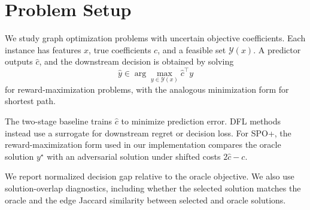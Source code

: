 \section{Problem Setup}

We study graph optimization problems with uncertain objective coefficients. Each
instance has features $x$, true coefficients $c$, and a feasible set
$\mathcal{Y}(x)$. A predictor outputs $\hat{c}$, and the downstream decision is
obtained by solving
\[
    \hat{y} \in \arg\max_{y \in \mathcal{Y}(x)} \hat{c}^{\top}y
\]
for reward-maximization problems, with the analogous minimization form for
shortest path.

The two-stage baseline trains $\hat{c}$ to minimize prediction error. DFL
methods instead use a surrogate for downstream regret or decision loss. For
SPO+, the reward-maximization form used in our implementation compares the
oracle solution $y^\star$ with an adversarial solution under shifted costs
$2\hat{c}-c$.

We report normalized decision gap relative to the oracle objective. We also use
solution-overlap diagnostics, including whether the selected solution matches
the oracle and the edge Jaccard similarity between selected and oracle
solutions.
